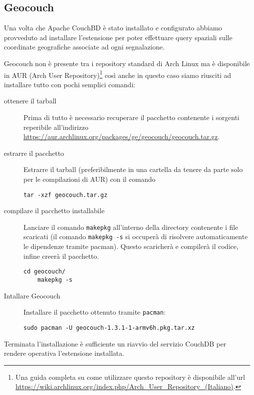         \subsection{Geocouch}
            Una volta che Apache CouchBD\texttrademark{} è stato installato e
            configurato abbiamo provveduto ad installare l'estensione per
            poter effettuare query spaziali sulle coordinate geografiche
            associate ad ogni segnalazione.

            Geocouch non è presente tra i repository standard di Arch Linux ma
            è disponibile in AUR (Arch User Repository)\footnote{Una guida
            completa su come utilizzare questo repository è disponibile
            all'url
            \url{https://wiki.archlinux.org/index.php/Arch_User_Repository_(Italiano)}.}
            così anche in questo caso siamo riusciti ad installare tutto con
            pochi semplici comandi:
            \begin{description}
                \item[ottenere il tarball]
                Prima di tutto è necessario recuperare il pacchetto
                contenente i sorgenti reperibile all'indirizzo
                \url{https://aur.archlinux.org/packages/ge/geocouch/geocouch.tar.gz}.
                \item[estrarre il pacchetto]
                Estrarre il tarball (preferibilmente in una cartella da tenere
                da parte solo per le compilazioni di AUR) con il comando
                \begin{lstlisting}[language=plane]
    tar -xzf geocouch.tar.gz
                \end{lstlisting}
                \item[compilare il pacchetto installabile]
                Lanciare il comando \texttt{makepkg} all'interno della directory
                contenente i file scaricati (il comando \texttt{makepkg -s} si
                occuperà di risolvere automaticamente le dipendenze tramite
                pacman). Questo scaricherà e compilerà il codice, infine
                creerà il pacchetto.
                \begin{lstlisting}[language=plane]
    cd geocouch/
    makepkg -s
                \end{lstlisting}
                \item[Intallare Geocouch]
                Installare il pacchetto ottenuto tramite \texttt{pacman}:
                \begin{lstlisting}[language=plane]
    sudo pacman -U geocouch-1.3.1-1-armv6h.pkg.tar.xz
                \end{lstlisting}
            \end{description}
            Terminata l'installazione è sufficiente un riavvio del servizio
            CouchDB per rendere operativa l'estensione installata.

